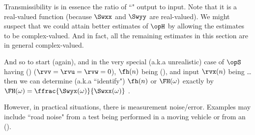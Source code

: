 Transmissibility is in essence the ratio of ``" 
output to  input.
Note that it is a real-valued function (because $\Swxx$ and $\Swyy$ are real-valued).
We might suspect that we could attain better estimates of $\opH$ by allowing the estimates to be complex-valued. %
And in fact, all the remaining estimates in this section are in general complex-valued.

And so to start (again), and in the very special (a.k.a unrealistic) case of $\opS$ having
 ()
($\rvv=\rvu=\rvw=0$),
$\fh(n)$ being  (),
and input $\rvx(n)$ being \ldots
then we can determine (a.k.a ``identify") $\fh(n)$ or $\FH(\omega)$
exactly by $\FH(\omega)=\ffrac{\Swyx(\omega)}{\Swxx(\omega)}$ .

However, in practical situations, there is measurement noise/error. %
Examples may include
``road noise" from a test being performed in a moving vehicle or  from an
 ().

